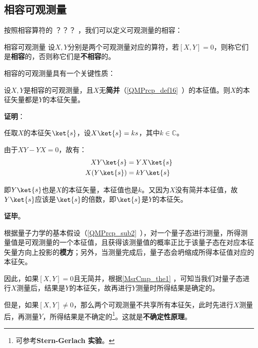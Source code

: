 


\subsection{相容可观测量}



按照相容算符的 ？？？
，我们可以定义可观测量的相容：

\begin{definition}{相容可观测量}
设$X, Y$分别是两个可观测量对应的算符，若$[X, Y]=0$，则称它们是\textbf{相容}的，否则称它们是\textbf{不相容}的。
\end{definition}

相容的可观测量具有一个关键性质：

\begin{theorem}{}\label{MsrCmp_the1}
设$X, Y$是相容的可观测量，且$X$无\textbf{简并}（\autoref{QMPrcp_def16}~）的本征值。则$X$的本征矢量都是$Y$的本征矢量。
\end{theorem}

\textbf{证明}：

任取$X$的本征矢$\ket{s}$，设$X\ket{s}=ks$，其中$k\in\mathbb{C}$。

由于$XY-YX=0$，故有：
\begin{equation}
\begin{aligned}
XY\ket{s} &= YX\ket{s}\\
X(Y\ket{s}) &= kY\ket{s}
\end{aligned}
\end{equation}

即$Y\ket{s}$也是$X$的本征矢量，本征值也是$k$。又因为$X$没有简并本征值，故$Y\ket{s}$应该是$\ket{s}$的倍数，即$\ket{s}$是$Y$的本征矢。

\textbf{证毕}。


根据量子力学的基本假设（\autoref{QMPrcp_sub2}~），对一个量子态进行测量，所得测量值是可观测量的一个本征值，且获得该测量值的概率正比于该量子态在对应本征矢量方向上投影的\textbf{模方}；另外，当测量完成后，量子态会坍缩成所得本征值对应的本征矢。

因此，如果$[X, Y]=0$且无简并，根据\autoref{MsrCmp_the1} ，可知当我们对量子态进行$X$测量后，结果是$Y$的本征矢，故再进行$Y$测量时所得结果是确定的。

但是，如果$[X, Y]\neq 0$，那么两个可观测量不共享所有本征矢，此时先进行$X$测量后，再测量$Y$，所得结果是不确定的\footnote{可参考\textbf{Stern-Gerlach 实验}。}。这就是\textbf{不确定性原理}。




